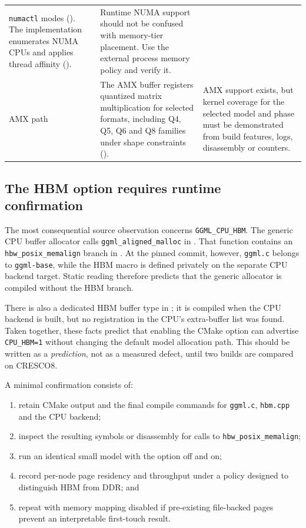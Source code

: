 \begin{table}[htbp]
\begin{tabularx}{\textwidth}{@{}P{2.8cm}P{5.35cm}Y@{}}
  \texttt{numactl} modes
  ().  The implementation enumerates
  NUMA CPUs and applies thread affinity
  ().
& Runtime NUMA support should not be confused with memory-tier
  placement.  Use the external process memory policy and verify it. \\
\addlinespace
AMX path
& The AMX buffer registers quantized matrix multiplication for selected
  formats, including Q4, Q5, Q6 and Q8 families under shape constraints
  ().
& AMX support exists, but kernel coverage for the selected model and
  phase must be demonstrated from build features, logs, disassembly or
  counters. \\
\bottomrule
\end{tabularx}
\end{table}

\subsection{The HBM option requires runtime confirmation}

The most consequential source observation concerns
\texttt{GGML\_CPU\_HBM}.  The generic CPU buffer allocator calls
\texttt{ggml\_aligned\_malloc} in
.  That function contains an
\texttt{hbw\_posix\_memalign} branch in
.  At the pinned commit, however,
\texttt{ggml.c} belongs to \texttt{ggml-base}, while the HBM macro is
defined privately on the separate CPU backend target.  Static reading
therefore predicts that the generic allocator is compiled without the
HBM branch.

There is also a dedicated HBM buffer type in ; it is
compiled when the CPU backend is built, but no registration in the
CPU's extra-buffer list was found.  Taken together, these facts predict
that enabling the CMake option can advertise \texttt{CPU\_HBM=1}
without changing the default model allocation path.  This should be
written as a \emph{prediction}, not as a measured defect, until two
builds are compared on CRESCO8.

A minimal confirmation consists of:

\begin{enumerate}
  \item retain CMake output and the final compile commands for
        \texttt{ggml.c}, \texttt{hbm.cpp} and the CPU backend;
  \item inspect the resulting symbols or disassembly for calls to
        \texttt{hbw\_posix\_memalign};
  \item run an identical small model with the option off and on;
  \item record per-node page residency and throughput under a policy
        designed to distinguish HBM from DDR; and
  \item repeat with memory mapping disabled if pre-existing file-backed
        pages prevent an interpretable first-touch result.
\end{enumerate}

